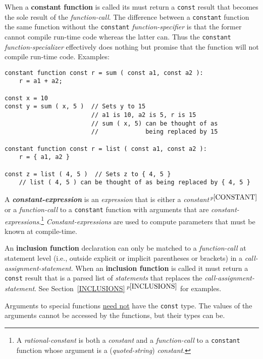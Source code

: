 \documentclass[12pt]{article}
\newcommand{\key}[1]{{\rm \bfseries #1}}
\newcommand{\emkey}[1]{{\em \bfseries #1}}
\newcommand{\itemref}[1]{\ref{#1}$\,^{p\pageref{#1}}$}
\newcommand{\pagnote}[1]{$\,^{p\pageref{#1}}$}
\newenvironment{indpar}[1][0.3in]%
	{\begin{list}{}%
		     {\setlength{\itemsep}{0in}%
		      \setlength{\topsep}{0in}%
		      \setlength{\parsep}{1ex}%
		      \setlength{\labelwidth}{#1}%
		      \setlength{\leftmargin}{#1}%
		      \addtolength{\leftmargin}{\labelsep}}%
	 \item}%
	{\end{list}}
\begin{document}
When a \key{constant function}\label{CONSTANT-FUNCTION} is called
its must return a {\tt const} result that becomes the sole
result of the {\em function-call}.  The difference between a
{\tt constant} function the same function without the {\tt constant}
{\em function-specifier} is that the former cannot compile run-time code
whereas the latter can.
Thus the {\tt constant} {\em function-specializer} effectively does nothing
but promise that the function will not compile run-time code.
Examples:
\begin{indpar}\begin{verbatim}
constant function const r = sum ( const a1, const a2 ):
    r = a1 + a2;

const x = 10
const y = sum ( x, 5 )  // Sets y to 15
                        // a1 is 10, a2 is 5, r is 15
                        // sum ( x, 5) can be thought of as
                        //             being replaced by 15

constant function const r = list ( const a1, const a2 ):
    r = { a1, a2 }

const z = list ( 4, 5 )  // Sets z to { 4, 5 }
    // list ( 4, 5 ) can be thought of as being replaced by { 4, 5 }
\end{verbatim}\end{indpar}


A \emkey{constant-expression}\label{CONSTANT-EXPRESSION}
is an {\em expression} that is either
a {\em constant}\pagnote{CONSTANT}
or a {\em function-call} to a {\tt constant} function
with arguments that are {\em constant-expressions}.\footnote{
A {\em rational-constant} is both a {\em constant} and a {\em function-call}
to a {\tt constant} function whose argument is a ({\em quoted-string})
{\em constant}.}
{\em Constant-expressions} are used to compute parameters that must be
known at compile-time.

An \key{inclusion function} declaration can only be matched to
a {\em function-call} at statement level (i.e., outside explicit or implicit
parentheses or brackets) in a {\em call-assign\-ment-statement}.
When an \key{inclusion function} is called it must return a {\tt const} result
that is a parsed list of {\em statements} that replaces
the {\em call-assignment-statement}.
See Section~\itemref{INCLUSIONS} for examples.

Arguments to special functions \underline{need not} have the {\tt const}
type.  The values of the arguments cannot be accessed by the functions,
but their types can be.
\end{document}
